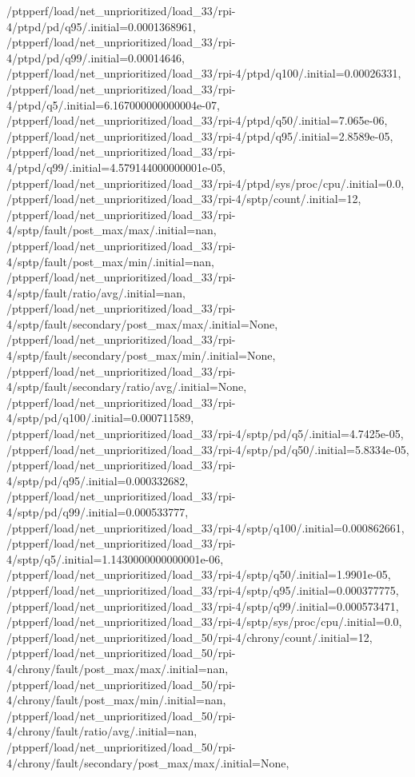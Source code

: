 {    /ptpperf/load/net_unprioritized/load_33/rpi-4/ptpd/pd/q95/.initial=0.0001368961,
    /ptpperf/load/net_unprioritized/load_33/rpi-4/ptpd/pd/q99/.initial=0.00014646,
    /ptpperf/load/net_unprioritized/load_33/rpi-4/ptpd/q100/.initial=0.00026331,
    /ptpperf/load/net_unprioritized/load_33/rpi-4/ptpd/q5/.initial=6.167000000000004e-07,
    /ptpperf/load/net_unprioritized/load_33/rpi-4/ptpd/q50/.initial=7.065e-06,
    /ptpperf/load/net_unprioritized/load_33/rpi-4/ptpd/q95/.initial=2.8589e-05,
    /ptpperf/load/net_unprioritized/load_33/rpi-4/ptpd/q99/.initial=4.579144000000001e-05,
    /ptpperf/load/net_unprioritized/load_33/rpi-4/ptpd/sys/proc/cpu/.initial=0.0,
    /ptpperf/load/net_unprioritized/load_33/rpi-4/sptp/count/.initial=12,
    /ptpperf/load/net_unprioritized/load_33/rpi-4/sptp/fault/post_max/max/.initial=nan,
    /ptpperf/load/net_unprioritized/load_33/rpi-4/sptp/fault/post_max/min/.initial=nan,
    /ptpperf/load/net_unprioritized/load_33/rpi-4/sptp/fault/ratio/avg/.initial=nan,
    /ptpperf/load/net_unprioritized/load_33/rpi-4/sptp/fault/secondary/post_max/max/.initial=None,
    /ptpperf/load/net_unprioritized/load_33/rpi-4/sptp/fault/secondary/post_max/min/.initial=None,
    /ptpperf/load/net_unprioritized/load_33/rpi-4/sptp/fault/secondary/ratio/avg/.initial=None,
    /ptpperf/load/net_unprioritized/load_33/rpi-4/sptp/pd/q100/.initial=0.000711589,
    /ptpperf/load/net_unprioritized/load_33/rpi-4/sptp/pd/q5/.initial=4.7425e-05,
    /ptpperf/load/net_unprioritized/load_33/rpi-4/sptp/pd/q50/.initial=5.8334e-05,
    /ptpperf/load/net_unprioritized/load_33/rpi-4/sptp/pd/q95/.initial=0.000332682,
    /ptpperf/load/net_unprioritized/load_33/rpi-4/sptp/pd/q99/.initial=0.000533777,
    /ptpperf/load/net_unprioritized/load_33/rpi-4/sptp/q100/.initial=0.000862661,
    /ptpperf/load/net_unprioritized/load_33/rpi-4/sptp/q5/.initial=1.1430000000000001e-06,
    /ptpperf/load/net_unprioritized/load_33/rpi-4/sptp/q50/.initial=1.9901e-05,
    /ptpperf/load/net_unprioritized/load_33/rpi-4/sptp/q95/.initial=0.000377775,
    /ptpperf/load/net_unprioritized/load_33/rpi-4/sptp/q99/.initial=0.000573471,
    /ptpperf/load/net_unprioritized/load_33/rpi-4/sptp/sys/proc/cpu/.initial=0.0,
    /ptpperf/load/net_unprioritized/load_50/rpi-4/chrony/count/.initial=12,
    /ptpperf/load/net_unprioritized/load_50/rpi-4/chrony/fault/post_max/max/.initial=nan,
    /ptpperf/load/net_unprioritized/load_50/rpi-4/chrony/fault/post_max/min/.initial=nan,
    /ptpperf/load/net_unprioritized/load_50/rpi-4/chrony/fault/ratio/avg/.initial=nan,
    /ptpperf/load/net_unprioritized/load_50/rpi-4/chrony/fault/secondary/post_max/max/.initial=None,
}
